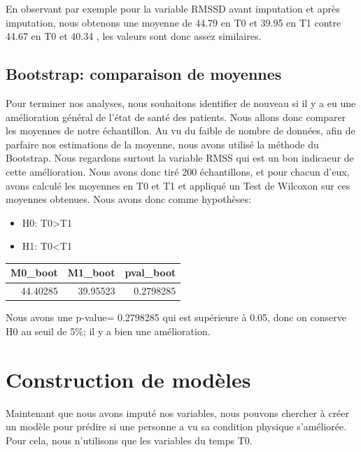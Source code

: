 \documentclass[]{article}
\providecommand{\tightlist}{%
  \setlength{\itemsep}{0pt}\setlength{\parskip}{0pt}}
\begin{document}
En observant par exemple pour la variable RMSSD avant imputation et
après imputation, nous obtenons une moyenne de 44.79 en T0 et 39.95 en
T1 contre 44.67 en T0 et 40.34 , les valeurs sont donc assez similaires.

\hypertarget{bootstrap-comparaison-de-moyennes}{%
\subsection{Bootstrap: comparaison de
moyennes}\label{bootstrap-comparaison-de-moyennes}}

Pour terminer nos analyses, nous souhaitons identifier de nouveau si il
y a eu une amélioration général de l'état de santé des patients. Nous
allons donc comparer les moyennes de notre échantillon. Au vu du faible
de nombre de données, afin de parfaire nos estimations de la moyenne,
nous avons utilisé la méthode du Bootstrap. Nous regardons surtout la
variable RMSS qui est un bon indicaeur de cette amélioration. Nous avons
donc tiré 200 échantillons, et pour chacun d'eux, avons calculé les
moyennes en T0 et T1 et appliqué un Test de Wilcoxon sur ces moyennes
obtenues. Nous avons donc comme hypothèses:

\begin{itemize}
\tightlist
\item
  H0: T0\textgreater{}T1
\item
  H1: T0\textless{}T1
\end{itemize}

\begin{table}[H]
\centering
\begin{tabular}{r|r|r}
\hline
M0\_boot & M1\_boot & pval\_boot\\
\hline
44.40285 & 39.95523 & 0.2798285\\
\hline
\end{tabular}
\end{table}

Nous avons une p-value= 0.2798285 qui est supérieure à 0.05, donc on
conserve H0 au seuil de 5\%; il y a bien une amélioration.

\hypertarget{construction-de-modeles}{%
\section{Construction de modèles}\label{construction-de-modeles}}

Maintenant que nous avons imputé nos variables, nous pouvons chercher à
créer un modèle pour prédire si une personne a vu sa condition physique
s'améliorée. Pour cela, nous n'utilisons que les variables du temps T0.
\end{document}
